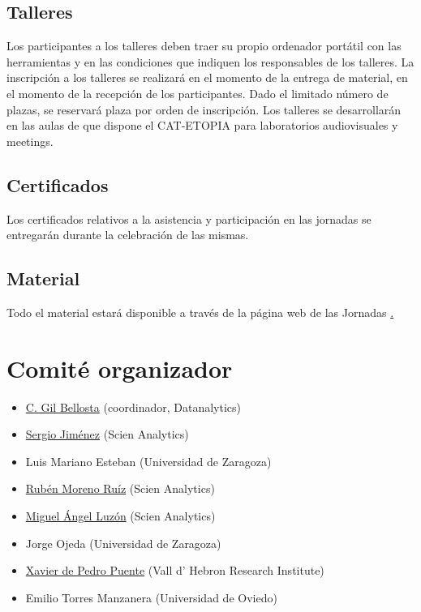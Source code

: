 \section{Talleres}

Los participantes a los talleres deben traer su propio ordenador portátil 
con las herramientas y en las condiciones que indiquen los responsables de 
los talleres. La inscripción a los talleres se realizará en el momento de 
la entrega de material, en el momento de la recepción de los participantes. 
Dado el limitado número de plazas, se reservará plaza por orden de inscripción. 
Los talleres se desarrollarán en las aulas de que dispone el CAT-ETOPIA 
para laboratorios audiovisuales y meetings.


\section{Certificados}

Los certificados relativos a la asistencia y participación en las jornadas
se entregarán durante la celebración de las mismas.


\section{Material}

Todo el material estará disponible a través de la página web de las Jornadas 
\href{http://r-es.org/V+Jornadas}. 



\chapter{Comité organizador}

\begin{itemize}

\item \href{http://www.datanalytics.com}{C. Gil Bellosta}
  (coordinador, Datanalytics)
\item \href{http://www.scien-analytics.com}{Sergio Jiménez} (Scien Analytics)
\item Luis Mariano Esteban (Universidad de Zaragoza)
\item \href{http://www.scien-analytics.com}{Rubén Moreno Ruíz} (Scien Analytics)
\item \href{[http://www.scien-analytics.com}{Miguel Ángel Luzón} (Scien Analytics)
\item Jorge Ojeda (Universidad de Zaragoza)
\item \href{http://ueb.vhir.org|Vall d'Hebron Research Institute}{Xavier de Pedro Puente} (Vall d' Hebron Research Institute)
\item  Emilio Torres Manzanera (Universidad de Oviedo)
\end{itemize}

